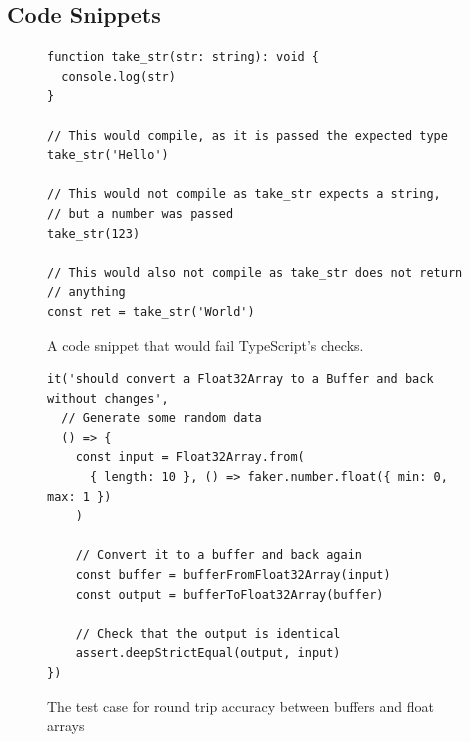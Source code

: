 \clearpage\subsection{Code Snippets}

\begin{figure}
  \caption{\label{fig:type_check}A code snippet that would fail TypeScript's checks.}
  \begin{verbatim}
function take_str(str: string): void {
  console.log(str)
}

// This would compile, as it is passed the expected type
take_str('Hello')

// This would not compile as take_str expects a string,
// but a number was passed
take_str(123)

// This would also not compile as take_str does not return
// anything
const ret = take_str('World')
  \end{verbatim}
\end{figure}

\begin{figure}[h]
  \centering
  \caption{\label{fig:buffer_float_array}The test case for round trip accuracy between buffers and float arrays}
  \begin{verbatim}
it('should convert a Float32Array to a Buffer and back without changes',
  // Generate some random data
  () => {
    const input = Float32Array.from(
      { length: 10 }, () => faker.number.float({ min: 0, max: 1 })
    )

    // Convert it to a buffer and back again
    const buffer = bufferFromFloat32Array(input)
    const output = bufferToFloat32Array(buffer)

    // Check that the output is identical
    assert.deepStrictEqual(output, input)
})
  \end{verbatim}
\end{figure}

